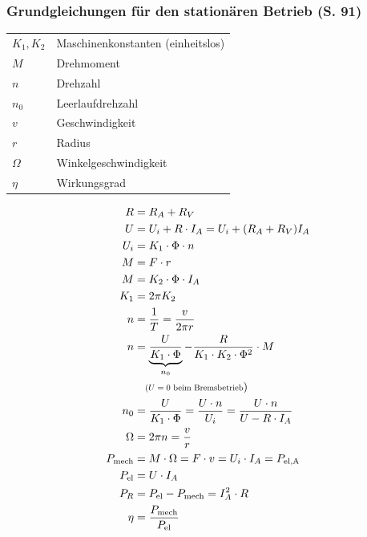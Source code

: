 \documentclass[a4paper,twocolumn,10pt]{article}
\begin{document}
\subsubsection{Grundgleichungen für den stationären Betrieb (S. 91)}
\begin{tabular}{ll}
$K_1,K_2$ & Maschinenkonstanten (einheitslos)\\
$M$ & Drehmoment\\
$n$ & Drehzahl\\
$n_0$ & Leerlaufdrehzahl\\
$v$ & Geschwindigkeit\\
$r$ & Radius\\
$\Omega$ & Winkelgeschwindigkeit\\
$\eta$ & Wirkungsgrad
\end{tabular}
\begin{equation*}
\begin{split}
R&=R_A+R_V \\
U&=U_i+R\cdot I_A=U_i+(R_A+R_V)I_A\\
U_i&=K_1\cdot\Phi\cdot n\\
M&=F\cdot r\\
M&=K_2\cdot\Phi\cdot I_A\\
K_1&=2\pi K_2\\
n&=\frac{1}{T}=\frac{v}{2\pi r}\\
n&=\underbrace{\frac{U}{K_1\cdot \Phi}}_{n_0}-\frac{R}{K_1\cdot K_2\cdot\Phi^2}\cdot M\\
&\quad \scalebox{.75}{($U=0$ beim Bremsbetrieb})\\
n_0&=\frac{U}{K_1\cdot\Phi}=\frac{U\cdot n}{U_i}=\frac{U\cdot n}{U-R\cdot I_A}\\
\Omega&=2\pi n=\frac{v}{r}\\
P_{\text{mech}}&=M\cdot\Omega=F\cdot v=U_i\cdot I_A=P_{\text{el,A}}\\
P_{\text{el}}&=U\cdot I_A\\
P_R&=P_{\text{el}}-P_{\text{mech}}=I_A^2\cdot R\\
\eta&=\frac{P_\text{mech}}{P_\text{el}}
\end{split}
\end{equation*}
\end{document}
